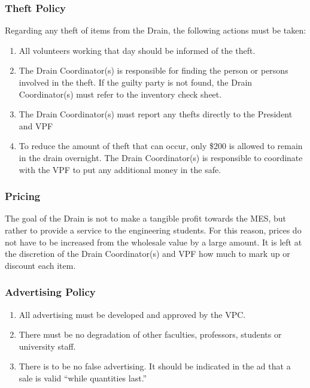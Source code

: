 \subsubsection{Theft Policy}
\label{theft-policy}
Regarding any theft of items from the Drain, the following actions must
be taken:

\begin{enumerate}
 \item
  All volunteers working that day should be informed of the theft.
 \item
  The Drain Coordinator(s) is responsible for finding the person or persons involved in the theft. If the guilty party is not found, the Drain Coordinator(s) must refer to the inventory check sheet.
 \item
  The Drain Coordinator(s) must report any thefts directly to the President and VPF
 \item
  To reduce the amount of theft that can occur, only \$200 is allowed to remain in the drain overnight. The Drain Coordinator(s) is responsible to coordinate with the VPF to put any additional money in the safe.
\end{enumerate}

\subsubsection{Pricing}
\label{pricing}
The goal of the Drain is not to make a tangible profit towards the MES,
but rather to provide a service to the engineering students. For this
reason, prices do not have to be increased from the wholesale value by a
large amount. It is left at the discretion of the Drain Coordinator(s)
and VPF how much to mark up or discount each item.

\subsubsection{Advertising Policy}
\label{advertising-policy}
\begin{enumerate}
 \item
  All advertising must be developed and approved by the VPC.
 \item
  There must be no degradation of other faculties, professors, students or university staff.
 \item
  There is to be no false advertising. It should be indicated in the ad that a sale is valid ``while quantities last.''

\end{enumerate}

